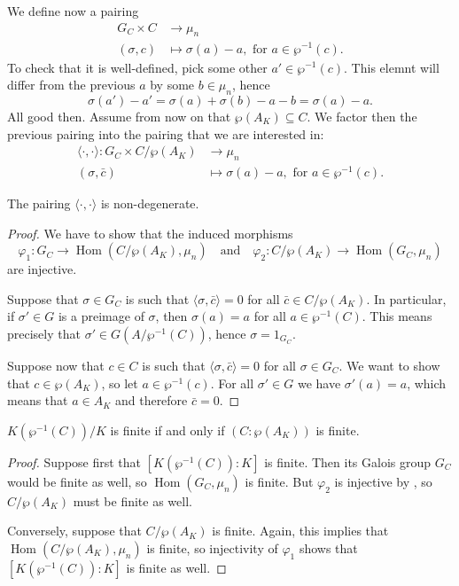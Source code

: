 \documentclass[12pt]{amsart}
\DeclareMathOperator{\Hom}{Hom}
\begin{document}
We define now a pairing
\begin{align*}
    G_{C}\times C &\longrightarrow \mu_{n} \\
    (\sigma,c) &\longmapsto \sigma(a)-a, \text{ for }a\in \wp^{-1}(c).
\end{align*}
To check that it is well-defined, pick some other $a'\in \wp^{-1}(c)$.
This elemnt will differ from the previous $a$ by some $b\in \mu_{n}$, hence
\[ \sigma(a')-a'=\sigma(a)+\sigma(b)-a-b=\sigma(a)-a. \]
All good then.
Assume from now on that $\wp(A_{K})\subseteq C$.
We factor then the previous pairing into the pairing that we are interested in:
\begin{align*}
    \langle \cdot,\cdot\rangle \colon G_{C}\times C/\wp(A_{K}) &\longrightarrow \mu_{n} \\
    (\sigma,\bar{c}) & \longmapsto \sigma(a)-a, \text{ for }a\in \wp^{-1}(c).
\end{align*}

\begin{prop}\label{prop:injectivity}
    The pairing $\langle \cdot,\cdot\rangle$ is non-degenerate.
    \begin{proof}
	We have to show that the induced morphisms
	\[ \varphi_{1}\colon G_{C}\to \Hom(C/\wp(A_{K}),\mu_{n}) \quad\text{and}\quad \varphi_{2}\colon C/\wp(A_{K})\to \Hom(G_{C},\mu_{n}) \]
	are injective.

	Suppose that $\sigma\in G_{C}$ is such that $\langle \sigma,\bar{c}\rangle=0$ for all $\bar{c}\in C/\wp(A_{K})$.
	In particular, if $\sigma'\in G$ is a preimage of $\sigma$, then $\sigma(a)=a$ for all $a\in \wp^{-1}(C)$.
	This means precisely that $\sigma'\in G(A/\wp^{-1}(C))$, hence $\sigma=1_{G_{C}}$.

	Suppose now that $c\in C$ is such that $\langle \sigma, \bar{c}\rangle=0$ for all $\sigma\in G_{C}$.
	We want to show that $c\in \wp(A_{K})$, so let $a\in \wp^{-1}(c)$.
	For all $\sigma'\in G$ we have $\sigma'(a)=a$, which means that $a\in A_{K}$ and therefore $\bar{c}=0$.
    \end{proof}
\end{prop}

\begin{prop}\label{prop:finiteness}
    $K(\wp^{-1}(C))/K$ is finite if and only if $(C:\wp(A_{K}))$ is finite.
    \begin{proof}
	Suppose first that $[K(\wp^{-1}(C)):K]$ is finite.
	Then its Galois group $G_{C}$ would be finite as well, so $\Hom(G_{C},\mu_{n})$ is finite.
	But $\varphi_{2}$ is injective by , so $C/\wp(A_{K})$ must be finite as well.

	Conversely, suppose that $C/\wp(A_{K})$ is finite.
	Again, this implies that $\Hom(C/\wp(A_{K}),\mu_{n})$ is finite, so injectivity of $\varphi_{1}$ shows that $[K(\wp^{-1}(C)):K]$ is finite as well.
    \end{proof}
\end{prop}
\end{document}
